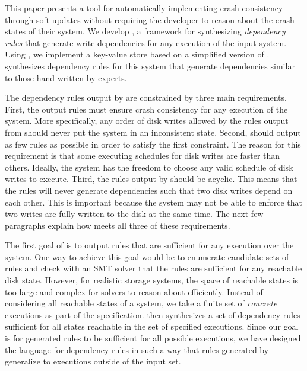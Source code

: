This paper presents a tool for automatically implementing crash consistency through soft updates
without requiring the developer to reason about the crash states of their system. We develop
\depsynth, a framework for synthesizing \textit{dependency rules} that generate write dependencies
for any execution of the input system. Using \depsynth, we implement a key-value store based
on a simplified version of . \depsynth synthesizes dependency rules for this
system that generate dependencies similar to those hand-written by experts.

The dependency rules output by \depsynth are constrained by three main requirements. First, the output
rules must ensure crash consistency for any execution of the system. More specifically, any
order of disk writes allowed by the rules output from \depsynth should never put the system in an
inconsistent state. Second, \depsynth should output as few rules as possible in order to satisfy the first
constraint. The reason for this requirement is that some executing schedules for disk writes are faster than
others. Ideally, the system has the freedom to choose any valid schedule of disk writes to execute. Third,
the rules output by \depsynth should be acyclic. This means that the rules will never generate dependencies
such that two disk writes depend on each other. This is important because the system may not be able to enforce
that two writes are fully written to the disk at the same time. The next few paragraphs explain how \depsynth
meets all three of these requirements.

The first goal of \depsynth is to output rules that are sufficient for any execution over the system. One way to
achieve this goal would be to enumerate candidate sets of rules and check with an SMT solver that
the rules are sufficient for any reachable disk state. However, for realistic storage systems, the space of
reachable states is too large and complex for solvers to reason about efficiently. Instead of considering
all reachable states of a system, we take a finite set of \textit{concrete} executions as part of the
specification. \depsynth then synthesizes a set of dependency rules sufficient for all states reachable
in the set of specified executions. Since our goal is for generated rules to be sufficient for all
possible executions, we have designed the language for dependency rules in such a way that rules
generated by \depsynth generalize to executions outside of the input set.

